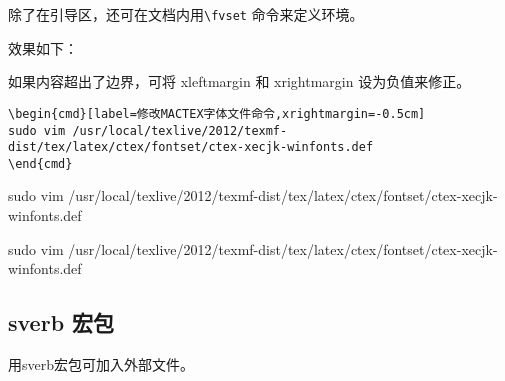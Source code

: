 
\begin{latexcmd}
  \begin{Verbatim}[fontsize=\small]
\end{latexcmd}
除了在引导区，还可在文档内用\verb|\fvset| 命令来定义环境。
\begin{latexcmd}
\end{latexcmd}
 效果如下：

如果内容超出了边界，可将 xleftmargin 和 xrightmargin 设为负值来修正。


\scriptsize
\begin{shaded}
\begin{verbatim}
\begin{cmd}[label=修改MACTEX字体文件命令,xrightmargin=-0.5cm]
sudo vim /usr/local/texlive/2012/texmf-dist/tex/latex/ctex/fontset/ctex-xecjk-winfonts.def
\end{cmd}
\end{verbatim}
\end{shaded}
\normalsize
\begin{cmd}[label=修改MACTEX字体文件命令]
sudo vim /usr/local/texlive/2012/texmf-dist/tex/latex/ctex/fontset/ctex-xecjk-winfonts.def
\end{cmd}
\begin{cmd}[label=修改MACTEX字体文件命令,xrightmargin=-0.5cm]
sudo vim /usr/local/texlive/2012/texmf-dist/tex/latex/ctex/fontset/ctex-xecjk-winfonts.def
\end{cmd}

\subsection{sverb 宏包}

用sverb宏包可加入外部文件。\\
